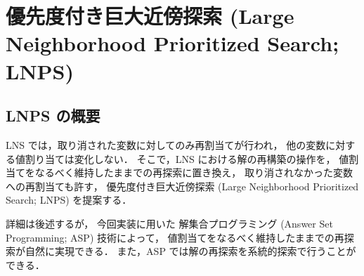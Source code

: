 \section{優先度付き巨大近傍探索 (Large Neighborhood Prioritized Search; LNPS)}

\subsection{LNPS の概要}
LNS では，取り消された変数に対してのみ再割当てが行われ，
他の変数に対する値割り当ては変化しない．
そこで，LNS における解の再構築の操作を，
値割当てをなるべく維持したままでの再探索に置き換え，
取り消されなかった変数への再割当ても許す，
優先度付き巨大近傍探索 (Large Neighborhood Prioritized Search; LNPS) を提案する．

詳細は後述するが，
今回実装に用いた
解集合プログラミング (Answer Set Programming; ASP) 技術によって，
値割当てをなるべく維持したままでの再探索が自然に実現できる．
また，ASP では解の再探索を系統的探索で行うことができる．


